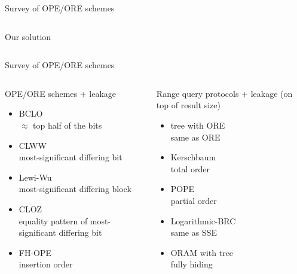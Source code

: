 \begin{frame}{Survey of OPE/ORE schemes~\cite{ore-benchmark-17}}
\begin{columns}[T,onlytextwidth]
{\begin{block}{Our solution}
						\end{block}
					}

			\end{columns}

		\end{frame}

		\begin{frame}{Survey of OPE/ORE schemes~\cite{ore-benchmark-17}}

			\begin{columns}[T,onlytextwidth]

					\begin{block}{OPE/ORE schemes + leakage}

						\begin{itemize}
							\item \normalsize BCLO~\cite{crypt-db-ope} \\ \small{$\approx$ top half of the bits}
							\item \normalsize CLWW~\cite{practical-ore} \\ \small{most-significant differing bit}
							\item \normalsize Lewi-Wu~\cite{lewi-ore} \\ \small{most-significant differing block}
							\item \normalsize CLOZ~\cite{adam-ore-v2} \\ \small{equality pattern of most-significant differing bit}
							\item \normalsize FH-OPE~\cite{fh-ope} \\ \small{insertion order}
						\end{itemize}

					\end{block}


					\begin{block}{Range query protocols + leakage (on top of result size)}

						\begin{itemize}
							\item \normalsize {\BPlus} tree with ORE \\ \small{same as ORE}
							\item \normalsize Kerschbaum~\cite{florian-protocol} \\ \small{total order}
							\item \normalsize POPE~\cite{pope} \\ \small{partial order}
							\item \normalsize Logarithmic-BRC~\cite{practical-range-search} \\ \small{same as SSE}
							\item \normalsize ORAM with {\BPlus} tree \\ \small{fully hiding}
						\end{itemize}


\end{block}
\end{columns}
\end{frame}
